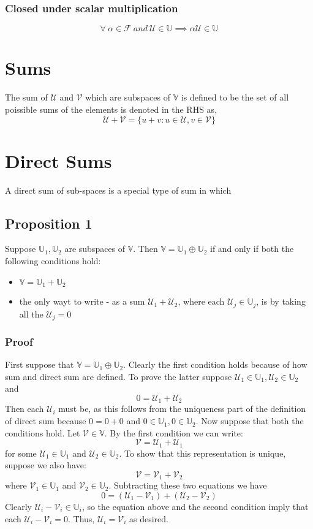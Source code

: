 \subsubsection{Closed under scalar multiplication}
$$\forall \  \alpha \in \mathcal{F} \ and \ \mathcal{U} \in \mathbb{U} \implies \alpha \mathcal{U} \in \mathbb{U}$$
\section{Sums}
The sum of $\mathcal{U}$ and $\mathcal{V}$ which are subspaces of $\mathbb{V}$ is defined to be the set of all poissible sums of the elements is denoted in the RHS as,
$$\mathcal{U} + \mathcal{V} = \{u + v: u \in \mathcal{U}, v \in  \mathcal{V}\}$$

\section{Direct Sums}
A direct sum of sub-spaces is a special type of sum in which
\subsection{Proposition 1}
Suppose $\mathbb{U}_1, \mathbb{U}_2$ are subspaces of $\mathbb{V}$. Then $\mathbb{V} = \mathbb{U}_1 \oplus \mathbb{U}_2$ if and only if both the following conditions hold:
\begin{itemize}
	\item $\mathbb{V} = \mathbb{U}_1 + \mathbb{U}_2$
	\item the only wayt to write - as a sum $\mathcal{U}_1 + \mathcal{U}_2$, where each $\mathcal{U}_j \in \mathbb{U}_j$, is by taking all the $\mathcal{U}_j = 0 $
\end{itemize}
\subsubsection{Proof}
 First suppose that $\mathbb{V} = \mathbb{U}_1 \oplus \mathbb{U}_2$. Clearly the first condition holds because of how sum and direct sum are defined. To prove the latter suppose $\mathcal{U}_1 \in \mathbb{U}_1, \mathcal{U}_2 \in \mathbb{U}_2$ and
 $$0 = \mathcal{U}_1 + \mathcal{U}_2$$
 Then each $\mathcal{U}_i$ must be, as this follows from the uniqueness part of the definition of direct sum because $0 = 0 + 0$ and $0 \in \mathbb{U}_1, 0 \in \mathbb{U}_2$. Now suppose that both the conditions hold. Let $\mathcal{V} \in \mathbb{V}$. By the first condition we can write:
 $$\mathcal{V} =  \mathcal{U}_1 + \mathcal{U}_1$$
 for some $\mathcal{U}_1 \in \mathbb{U}_1$ and $\mathcal{U}_2 \in \mathbb{U}_2$. To show that this representation is unique, suppose we also have:
 $$\mathcal{V} = \mathcal{V}_1 + \mathcal{V}_2$$
 where $\mathcal{V}_1 \in \mathbb{U}_1$ and $\mathcal{V}_2 \in \mathbb{U}_2$. Subtracting these two equations we have
 $$0 = (\mathcal{U}_1 - \mathcal{V}_1) + (\mathcal{U}_2 - \mathcal{V}_2)$$
 Clearly $\mathcal{U}_i - \mathcal{V}_i \in \mathbb{U}_i$, so the equation above and the second condition imply that each $\mathcal{U}_i - \mathcal{V}_i = 0$. Thus, $\mathcal{U}_i = \mathcal{V}_i$ as desired.
